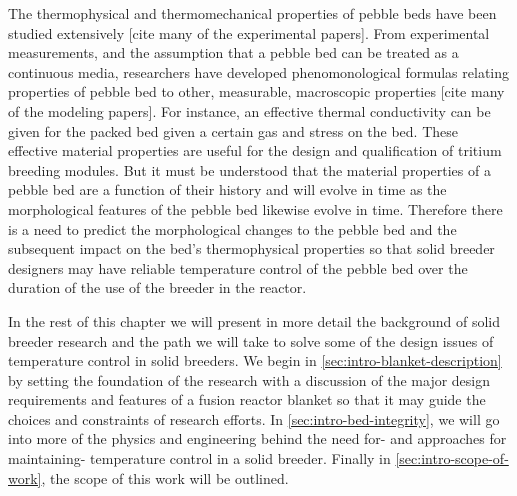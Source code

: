 The thermophysical and thermomechanical properties of pebble beds have been studied extensively [cite many of the experimental papers]. From experimental measurements, and the assumption that a pebble bed can be treated as a continuous media, researchers have developed phenomonological formulas relating properties of pebble bed to other, measurable, macroscopic properties [cite many of the modeling papers]. For instance, an effective thermal conductivity can be given for the packed bed given a certain gas and stress on the bed. These effective material properties are useful for the design and qualification of tritium breeding modules. But it must be understood that the material properties of a pebble bed are a function of their history and will evolve in time as the morphological features of the pebble bed likewise evolve in time. Therefore there is a need to predict the morphological changes to the pebble bed and the subsequent impact on the bed's thermophysical properties so that solid breeder designers may have reliable temperature control of the pebble bed over the duration of the use of the breeder in the reactor. 

In the rest of this chapter we will present in more detail the background of solid breeder research and the path we will take to solve some of the design issues of temperature control in solid breeders. We begin in \cref{sec:intro-blanket-description} by setting the foundation of the research with a discussion of the major design requirements and features of a fusion reactor blanket so that it may guide the choices and constraints of research efforts. In \cref{sec:intro-bed-integrity}, we will go into more of the physics and engineering behind the need for- and approaches for maintaining- temperature control in a solid breeder. Finally in \cref{sec:intro-scope-of-work}, the scope of this work will be outlined.






